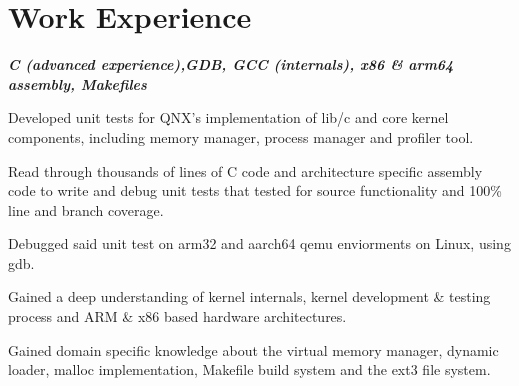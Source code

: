 \documentclass[letterpaper, 10pt]{deedy-resume} %
\begin{document}
\begin{minipage}[t]{0.65\textwidth} %

\section{Work Experience}

\textit{\bf{C (advanced experience),GDB, GCC (internals), x86 \& arm64 assembly, Makefiles}}
\vspace{\topsep}
\vspace{\topsep} %
\begin{tightitemize}
\item Developed unit tests for QNX's implementation of lib/c and core kernel components, including memory manager, process manager and profiler tool. 
\item Read through thousands of lines of C code and architecture specific assembly code to write and debug unit tests that tested for source functionality and 100\% line and branch coverage. 
\item Debugged said unit test on arm32 and aarch64 qemu enviorments on Linux, using gdb.
\item Gained a deep understanding of kernel internals, kernel development \& testing process and ARM \& x86 based hardware architectures. 
\item Gained domain specific knowledge about the virtual memory manager, dynamic loader, malloc implementation, Makefile build system and the ext3 file system. 
\end{tightitemize}
\sectionspace 


\end{minipage}
\end{document}
